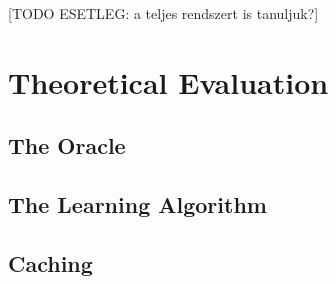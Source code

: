 [TODO ESETLEG: a teljes rendszert is tanuljuk?]

\clearpage
\section{Theoretical Evaluation} \label{sec_theoeval}

\subsection{The Oracle} \label{subs_evaloracle}

\subsection{The Learning Algorithm} \label{subs_evallearningalgo}

\subsection{Caching} \label{subs_evalcaching}
